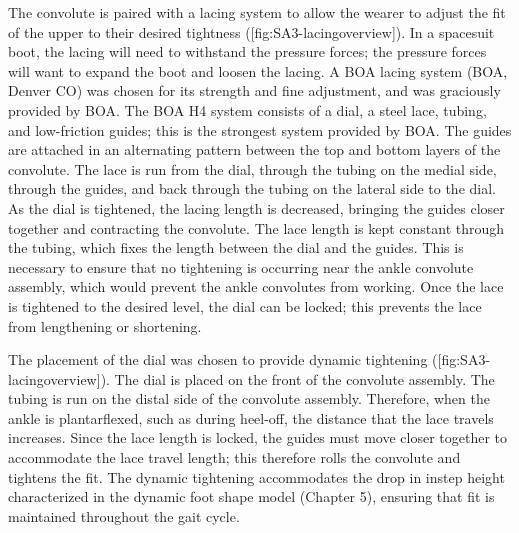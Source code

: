 \documentclass[defaultstyle,11pt]{comps}
\begin{document}
The convolute is paired with a lacing system to allow the wearer to adjust the fit of the upper to their desired tightness ({[}fig:SA3-lacingoverview{]}).
In a spacesuit boot, the lacing will need to withstand the pressure forces; the pressure forces will want to expand the boot and loosen the lacing.
A BOA lacing system (BOA, Denver CO) was chosen for its strength and fine adjustment, and was graciously provided by BOA.
The BOA H4 system consists of a dial, a steel lace, tubing, and low-friction guides; this is the strongest system provided by BOA.
The guides are attached in an alternating pattern between the top and bottom layers of the convolute.
The lace is run from the dial, through the tubing on the medial side, through the guides, and back through the tubing on the lateral side to the dial.
As the dial is tightened, the lacing length is decreased, bringing the guides closer together and contracting the convolute.
The lace length is kept constant through the tubing, which fixes the length between the dial and the guides.
This is necessary to ensure that no tightening is occurring near the ankle convolute assembly, which would prevent the ankle convolutes from working.
Once the lace is tightened to the desired level, the dial can be locked; this prevents the lace from lengthening or shortening.

The placement of the dial was chosen to provide dynamic tightening ({[}fig:SA3-lacingoverview{]}).
The dial is placed on the front of the convolute assembly.
The tubing is run on the distal side of the convolute assembly.
Therefore, when the ankle is plantarflexed, such as during heel-off, the distance that the lace travels increases.
Since the lace length is locked, the guides must move closer together to accommodate the lace travel length; this therefore rolls the convolute and tightens the fit.
The dynamic tightening accommodates the drop in instep height characterized in the dynamic foot shape model (Chapter 5), ensuring that fit is maintained throughout the gait cycle.
\end{document}
